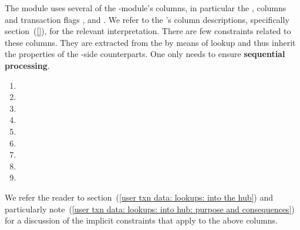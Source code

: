The \txnDataMod{} module uses several of the \hubMod{}-module's columns, in particular
the \totalTransactionNumber{}, \userTransactionNumber{} columns and transaction flags \sysi{}, \user{} and \sysf{}.
We refer to the \hubMod{}'s column descriptions,
specifically section~(\ref{}),
for the relevant interpretation.
There are few constraints related to these columns.
They are extracted from the \hubMod{} by means of lookup and thus inherit the properties of the \hubMod{}-side counterparts.
One only needs to ensure \textbf{sequential processing}.
\begin{multicols}{3}
	\begin{enumerate}
		\item \blockNumber
		\item[\vspace{\fill}]
		\item[\vspace{\fill}]
		\item \totalTransactionNumber
		\item \userTransactionNumber
		\item[\vspace{\fill}]
		\item \sysi
		\item \user
		\item \sysf
	\end{enumerate}
\end{multicols}
\noindent We refer the reader to
section~(\ref{user txn data: lookups: into the hub}) and particularly
note~(\ref{user txn data: lookups: into hub: purpose and consequences})
for a discussion of the implicit constraints that apply to the above columns.

